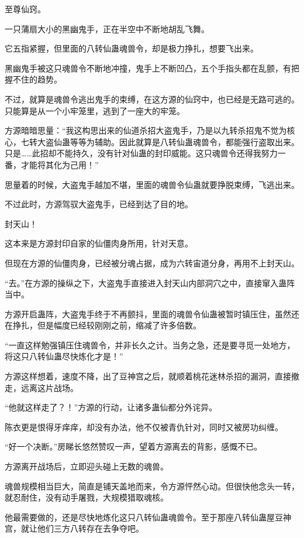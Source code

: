 
\begin{this_body}

至尊仙窍。

一只蒲扇大小的黑幽鬼手，正在半空中不断地胡乱飞舞。

它五指紧握，但里面的八转仙蛊魂兽令，却是极力挣扎，想要飞出来。

黑幽鬼手被这只魂兽令不断地冲撞，鬼手上不断凹凸，五个手指头都在乱颤，有把握不住的趋势。

不过，就算是魂兽令逃出鬼手的束缚，在这方源的仙窍中，也已经是无路可逃的。只能算是从一个小牢笼里，逃到了一座大的牢笼。

方源暗暗思量：“我这构思出来的仙道杀招大盗鬼手，乃是以九转杀招鬼不觉为核心，七转大盗仙蛊等等为辅助。因此就算是八转仙蛊魂兽令，都能强行盗取出来。只是……此招却不能持久，没有针对仙蛊的封印威能。这只魂兽令还得我努力一番，才能将其化为己用！”

思量着的时候，大盗鬼手越加不堪，里面的魂兽令仙蛊就要挣脱束缚，飞逃出来。

不过此时，方源驾驭大盗鬼手，已经到达了目的地。

封天山！

这本来是方源封印自家的仙僵肉身所用，针对天意。

但现在方源的仙僵肉身，已经被分魂占据，成为六转宙道分身，再用不上封天山。

“去。”在方源的操纵之下，大盗鬼手直接进入封天山内部洞穴之中，直接窜入蛊阵当中。

方源开启蛊阵，大盗鬼手终于不再颤抖，里面的魂兽令仙蛊被暂时镇压住，虽然还在挣扎，但是幅度已经较刚刚之前，缩减了许多倍数。

“一直这样勉强镇压住魂兽令，并非长久之计。当务之急，还是要寻觅一处地方，将这只八转仙蛊尽快炼化才是！”

方源这样想着，速度不降，出了豆神宫之后，就顺着桃花迷林杀招的漏洞，直接撤走，远离这片战场。

“他就这样走了？！”方源的行动，让诸多蛊仙都分外诧异。

陈衣更是恨得牙痒痒，却没有办法，他不仅被青仇针对，同时又被房功纠缠。

“好一个决断。”房睇长悠然赞叹一声，望着方源离去的背影，感慨不已。

方源离开战场后，立即迎头碰上无数的魂兽。

魂兽规模相当巨大，简直是铺天盖地而来，令方源怦然心动。但很快他念头一转，就忍耐住，没有动手屠戮，大规模猎取魂核。

他最需要做的，还是尽快地炼化这只八转仙蛊魂兽令。至于那座八转仙蛊屋豆神宫，就让他们三方八转存在去争夺吧。


\end{this_body}
